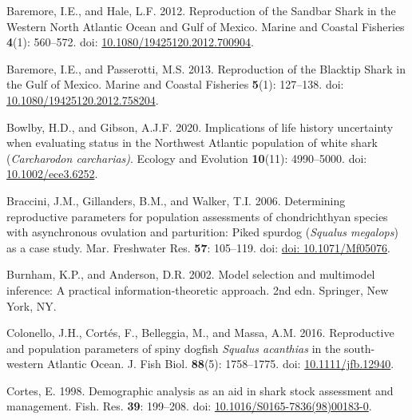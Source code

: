 \documentclass[
]{article}
\newenvironment{CSLReferences}%
  {}%
  {\par}
\begin{document}
\label{refs}
\begin{CSLReferences}{1}{0}
Baremore, I.E., and Hale, L.F. 2012. Reproduction of the {Sandbar} {Shark} in the {Western} {North} {Atlantic} {Ocean} and {Gulf} of {Mexico}. Marine and Coastal Fisheries \textbf{4}(1): 560--572. doi: \href{https://doi.org/10.1080/19425120.2012.700904}{10.1080/19425120.2012.700904}.

Baremore, I.E., and Passerotti, M.S. 2013. Reproduction of the {Blacktip} {Shark} in the {Gulf} of {Mexico}. Marine and Coastal Fisheries \textbf{5}(1): 127--138. doi: \href{https://doi.org/10.1080/19425120.2012.758204}{10.1080/19425120.2012.758204}.

Bowlby, H.D., and Gibson, A.J.F. 2020. Implications of life history uncertainty when evaluating status in the {Northwest} {Atlantic} population of white shark (\emph{{Carcharodon} carcharias)}. Ecology and Evolution \textbf{10}(11): 4990--5000. doi: \href{https://doi.org/10.1002/ece3.6252}{10.1002/ece3.6252}.

Braccini, J.M., Gillanders, B.M., and Walker, T.I. 2006. Determining reproductive parameters for population assessments of chondrichthyan species with asynchronous ovulation and parturition: Piked spurdog (\emph{{Squalus} megalops}) as a case study. Mar. Freshwater Res. \textbf{57}: 105--119. doi: \href{https://doi.org/doi:\%2010.1071/Mf05076}{doi: 10.1071/Mf05076}.

Burnham, K.P., and Anderson, D.R. 2002. Model selection and multimodel inference: A practical information-theoretic approach. 2nd edn. Springer, New York, NY.

Colonello, J.H., Cortés, F., Belleggia, M., and Massa, A.M. 2016. Reproductive and population parameters of spiny dogfish \emph{{Squalus} acanthias} in the south-western {Atlantic} {Ocean}. J. Fish Biol. \textbf{88}(5): 1758--1775. doi: \href{https://doi.org/10.1111/jfb.12940}{10.1111/jfb.12940}.

Cortes, E. 1998. Demographic analysis as an aid in shark stock assessment and management. Fish. Res. \textbf{39}: 199--208. doi: \href{https://doi.org/10.1016/S0165-7836(98)00183-0}{10.1016/S0165-7836(98)00183-0}.


\end{CSLReferences}
\end{document}

